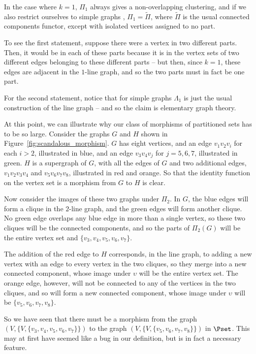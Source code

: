 \documentclass[a4paper,reqno,oneside]{article} %
\begin{document}
\begin{remark}\label{remark:k1_case_nonoverlapping}
    In the case where $k=1$, $\Pi_1$ always gives a non-overlapping clustering, and if we also restrict ourselves to simple graphs , $\Pi_1 = \tilde{\Pi}$, where $\tilde{\Pi}$ is the usual connected components functor, except with isolated vertices assigned to no part.

    To see the first statement, suppose there were a vertex in two different parts. Then, it would be in each of these parts because it is in the vertex sets of two different edges belonging to these different parts -- but then, since $k=1$, these edges are adjacent in the $1$-line graph, and so the two parts must in fact be one part.

    For the second statement, notice that for simple graphs $\Lambda_1$ is just the usual construction of the line graph -- and so the claim is elementary graph theory.
\end{remark}

\begin{example}\label{ex:scandalous_morphism}
    At this point, we can illustrate why our class of morphisms of partitioned sets has to be so large. Consider the graphs $G$ and $H$ shown in Figure~\ref{fig:scandalous_morphism}. $G$ has eight vertices, and an edge $v_1 v_2 v_i$ for each $i > 2$, illustrated in blue, and an edge $v_3 v_4 v_j$ for $j = 5, 6, 7$, illustrated in green. $H$ is a supergraph of $G$, with all the edges of $G$ and two additional edges, $v_1 v_2 v_3 v_4$ and $v_5 v_6 v_7 v_8$, illustrated in red and orange. So that the identity function on the vertex set is a morphism from $G$ to $H$ is clear.

    Now consider the images of these two graphs under $\Pi_2$. In $G$, the blue edges will form a clique in the $2$-line graph, and the green edges will form another clique. No green edge overlaps any blue edge in more than a single vertex, so these two cliques will be the connected components, and so the parts of $\Pi_2(G)$ will be the entire vertex set and $\{v_3, v_4, v_5, v_6, v_7\}$.

    The addition of the red edge to $H$ corresponds, in the line graph, to adding a new vertex with an edge to every vertex in the two cliques, so they merge into a new connected component, whose image under $\upsilon$ will be the entire vertex set. The orange edge, however, will not be connected to any of the vertices in the two cliques, and so will form a new connected component, whose image under $\upsilon$ will be $\{v_5, v_6, v_7, v_8\}$.

    So we have seen that there must be a morphism from the graph $(V, \{V, \{v_3,\allowbreak v_4,\allowbreak v_5, v_6, v_7\}\})$ to the graph $(V, \{V, \{v_5, v_6, v_7, v_8\}\})$ in $\Pset$. This may at first have seemed like a bug in our definition, but is in fact a necessary feature.
\end{example}
\end{document}
